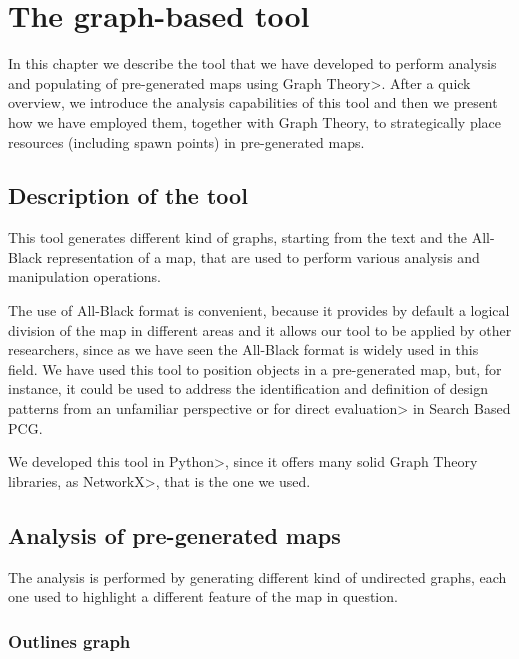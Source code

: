 \chapter{The graph-based tool}


In this chapter we describe the tool that we have developed to perform analysis and populating of pre-generated maps using \<Graph Theory>. After a quick overview, we introduce the analysis capabilities of this tool and then we present how we have employed them, together with Graph Theory, to strategically place resources (including spawn points) in pre-generated maps.


\section{Description of the tool}

This tool generates different kind of graphs, starting from the text and the All-Black representation of a map, that are used to perform various analysis and manipulation operations.

\par

The use of All-Black format is convenient, because it provides by default a logical division of the map in different areas and it allows our tool to be applied by other researchers, since as we have seen the All-Black format is widely used in this field. We have used this tool to position objects in a pre-generated map, but, for instance, it could be used to address the identification and definition of design patterns from an unfamiliar perspective or for \<direct evaluation> in Search Based PCG.

\par 

We developed this tool in \<Python>, since it offers many solid Graph Theory libraries, as \<NetworkX>, that is the one we used.


\section{Analysis of pre-generated maps}

The analysis is performed by generating different kind of undirected graphs, each one used to highlight a different feature of the map in question.

\subsection{Outlines graph}

